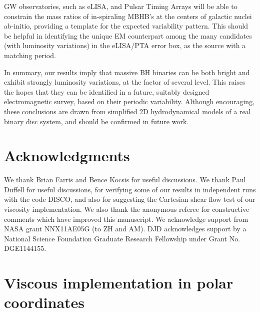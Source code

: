GW observatories, such as eLISA, and Pulsar Timing Arrays will be able to constrain the mass
ratios of in-spiraling MBHB's at the centers of galactic nuclei
ab-initio, providing a template for the expected variability pattern.
This should be helpful in identifying the unique EM counterpart among
the many candidates (with luminosity variations) in the eLISA/PTA error
box, as the source with a matching period.

In summary, our results imply that massive BH binaries can be both
bright and exhibit strongly luminosity variations, at the factor of
several level. This raises the hopes that they can be identified in a
future, suitably designed electromagnetic survey, based on their
periodic variability.  Although encouraging, these conclusions are
drawn from simplified 2D hydrodynamical models of a real binary disc
system, and should be confirmed in future work.


\section*{Acknowledgments}

We thank Brian Farris and Bence Kocsis for useful discussions.  We thank Paul
Duffell for useful discussions, for verifying some of our results
in independent runs with the code DISCO, and also for suggesting 
the Cartesian shear flow test of our viscosity implementation. We also thank 
the anonymous referee for constructive comments which have improved this manuscript. 
We acknowledge support from NASA grant NNX11AE05G (to ZH and AM). 
DJD acknowledges support by a National Science Foundation Graduate 
Research Fellowship under Grant No. DGE1144155.

%

\section{Viscous implementation in polar coordinates}
